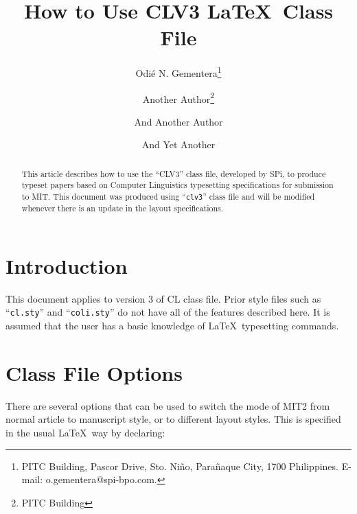\documentclass{clv3}
\begin{document}





\title{How to Use CLV3 \LaTeX\ Class File}

\author{Odi\'e N. Gementera\thanks{PITC Building, Pascor Drive, Sto. Ni\~no, Para\~naque City, 1700 Philippines. E-mail: o.gementera@spi-bpo.com.}}

\author{Another Author\thanks{PITC Building}}

\author{And Another Author}

\author{And Yet Another}

\maketitle

\begin{abstract}
This article describes how to use the ``CLV3'' class file, developed by {\sf SPi}, 
to produce typeset papers based on Computer Linguistics typesetting specifications 
for submission to MIT. This document was produced using ``{\tt clv3}'' class file 
and will be modified whenever there is an update in the layout specifications.
\end{abstract}

\section{Introduction}

This document applies to version 3 of CL class file. Prior style files such as 
``{\tt cl.sty}'' and ``{\tt coli.sty}'' do not have all of the features 
described here. It is assumed that the user has a basic knowledge of \LaTeX\ 
typesetting commands.

\section{Class File Options}

There are several options that can be used to switch the mode of MIT2 from normal 
article to manuscript style, or to different layout styles. This is specified in 
the usual \LaTeX\ way by declaring:
\end{document}
